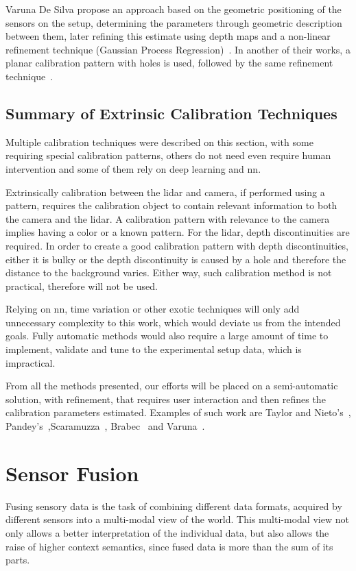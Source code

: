 Varuna De Silva \etal propose an approach based on the geometric positioning of the sensors on the setup, determining the parameters through geometric description between them, later refining this estimate using depth maps and a non-linear refinement technique (Gaussian Process Regression)~\cite{DeSilva2018}. In another of their works, a planar calibration pattern with holes is used, followed by the same refinement technique~\cite{Silva2018}.


\subsection{Summary of Extrinsic Calibration Techniques}
Multiple calibration techniques were described on this section, with some requiring special calibration patterns, others do not need even require human intervention and some of them rely on deep learning and \ac{nn}. 

Extrinsically calibration between the \ac{lidar} and camera, if performed using a pattern,  requires the calibration object to contain relevant information to both the camera and the \ac{lidar}. A calibration pattern with relevance to the camera implies having a color or a known pattern. For the \ac{lidar}, depth discontinuities are required. In order to create a good calibration pattern with depth discontinuities, either it is bulky or the depth discontinuity is caused by a hole and therefore the distance to the background varies. Either way, such calibration method is not practical, therefore will not be used.

Relying on \ac{nn}, time variation or other exotic techniques will only add unnecessary complexity to this work, which would deviate us from the intended goals. Fully automatic methods would also require a large amount of time to implement, validate and tune to the experimental setup data, which is impractical.

From all the methods presented, our efforts will be placed on a semi-automatic solution, with refinement, that requires user interaction and then refines the calibration parameters estimated. Examples of such work are Taylor and Nieto's~\cite{Taylor2013}, Pandey's~\cite{Pandey2012},Scaramuzza~\cite{Scaramuzza}, Brabec~\cite{brabec2014} and Varuna~\cite{DeSilva2018}.


\section{Sensor Fusion}
\label{sec:sota:sensor-fusion}
Fusing sensory data is the task of combining different data formats, acquired by different sensors into a multi-modal view of the world. This multi-modal view not only allows a better interpretation of the individual data, but also allows the raise of higher context semantics, since fused data is more than the sum of its parts.

